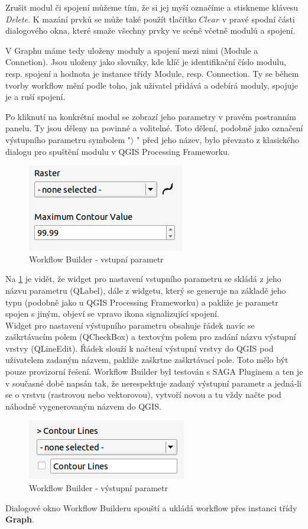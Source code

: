 Zrušit modul či spojení můžeme tím, že si jej myší označíme a
stiskneme klávesu \textit{Delete}. K mazání prvků se může také použít
tlačítko $Clear$ v pravé spodní části dialogového okna, které smaže
všechny prvky ve scéně včetně modulů a spojení.

V Graphu máme tedy uloženy moduly a spojení mezi nimi (Module a
Connetion). Jsou uloženy jako slovníky, kde klíč je identifikační
číslo modulu, resp. spojení a hodnota je instance třídy Module,
resp. Connection. Ty se během tvorby workflow mění podle toho, jak
uživatel přidává a odebírá moduly, spojuje je a ruší spojení.


Po kliknutí na konkrétní modul se zobrazí jeho parametry v pravém
postranním panelu. Ty jsou děleny na povinné a volitelné. Toto dělení,
podobně jako označení výstupního parametru symbolem "$\rangle$ " před
jeho název, bylo převzato z klasického dialogu pro spuštění modulu v
QGIS Processing Frameworku. \\

\begin{figure}[h]
	\centering
	\includegraphics[scale=0.9]{pictures/wf/wf_inPar}
	\caption{Workflow Builder - vstupní parametr}
  	\label{wf:inPar}
\end{figure}

Na \figurename \ref{wf:inPar} je vidět, že widget pro nastavení
vstupního parametru se skládá z jeho názvu parametru (QLabel), dále z
widgetu, který se generuje na základě jeho typu (podobně jako u QGIS
Processing Frameworku) a pakliže je parametr spojen s jiným, objeví se
vpravo ikona signalizující spojení. \\

Widget pro nastavení výstupního parametru obsahuje řádek navíc se
zaškrtávacím polem (QCheckBox) a textovým polem pro zadání názvu
výstupní vrstvy (QLineEdit). Řádek slouží k načtení výstupní vrstvy do
QGIS pod uživatelem zadaným názvem, pakliže zaškrtne zaškrtávací
pole. Toto mělo být pouze provizorní řešení. Workflow Builder byl
testován s SAGA Pluginem a ten je v současné době napsán tak, že
nerespektuje zadaný výstupní parametr a jedná-li se o vrstvu
(rastrovou nebo vektorovou), vytvoří novou a tu vždy načte pod náhodně
vygenerovaným názvem do QGIS. \\

\begin{figure}[!]
	\centering
	\includegraphics[scale=1.0]{pictures/wf/wf_outPar}
	\caption{Workflow Builder - výstupní parametr}
  	\label{wf:outPar}
\end{figure}

Dialogové okno Workflow Builderu spouští a ukládá workflow přes instanci třídy \textbf{Graph}. 

